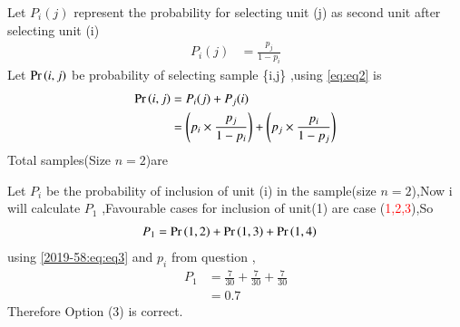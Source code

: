 Let $P_{i}(j)$ represent the probability for selecting unit (j) as second unit after selecting  unit (i) 
\begin{align}
    P_{i}(j)&=\frac{p_{j}}{1-p_{i}}
    \label{2019-58:eq:eq2}
\end{align}
Let  $\Pr\left(i,j\right)$ be probability of selecting sample \{i,j\} ,using \eqref{eq:eq2}  is 
\begin{align}
    \Pr\left(i,j\right)&=P_{i}(j)+P_{j}(i)
    \\
    &=\left(p_{i}\times \frac{p_{j}}{1-p_{i}}\right) + \left(p_{j}\times \frac{p_{i}}{1-p_{j}}\right)
    \label{2019-58:eq:eq3}
\end{align}
Total samples(Size $n=2$)are 
\begin{table}[h!]
  \caption{ list of samples}
  \label{2019-58:tab:label1_test}
\end{table}
Let $P_{i}$ be the probability of inclusion of unit (i) in the sample(size $n=2$),Now i will calculate $P_{1}$ ,Favourable cases for inclusion of unit(1) are case (\textcolor{red}{1,2,3}),So
\begin{align}
    P_{1}&=\Pr\left(1,2\right) +\Pr\left(1,3\right)+\Pr\left(1,4\right)
\end{align}
using \eqref{2019-58:eq:eq3} and $p_{i}$ from question ,
\begin{align}
    P_{1}&=\frac{7}{30} + \frac{7}{30} + \frac{7}{30}
    \\
    &=0.7
\end{align}
Therefore Option (3) is correct.
